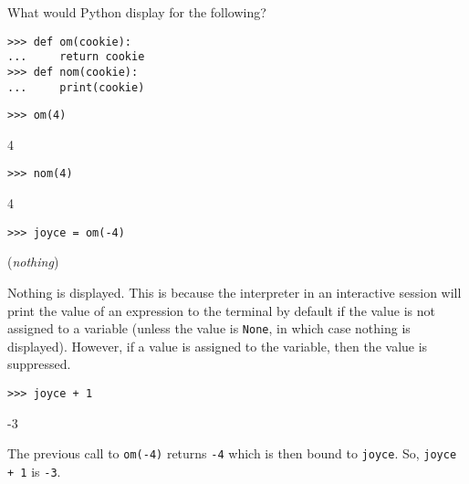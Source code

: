 
\begin{blocksection}
\question What would Python display for the following?
\begin{lstlisting}
>>> def om(cookie):
...     return cookie
>>> def nom(cookie):
...     print(cookie)
\end{lstlisting}
\end{blocksection}
\begin{blocksection}
\begin{lstlisting}
>>> om(4)
\end{lstlisting}
\begin{solution}[0.3in]
4
\end{solution}
\begin{lstlisting}
>>> nom(4)
\end{lstlisting}
\begin{solution}[0.3in]
4
\end{solution}
\end{blocksection}
\begin{blocksection}
\begin{lstlisting}
>>> joyce = om(-4)
\end{lstlisting}
\begin{solution}[0.3in]
(\emph{nothing})

Nothing is displayed. This is because the interpreter in an interactive session
will print the value of an expression to the terminal by default if the value
is not assigned to a variable (unless the value is \texttt{None}, in which case
nothing is displayed). However, if a value is assigned to the variable, then
the value is suppressed.
\end{solution}
\begin{lstlisting}
>>> joyce + 1
\end{lstlisting}
\begin{solution}[0.3in]
-3

The previous call to \texttt{om(-4)} returns \texttt{-4} which is then bound to
\texttt{joyce}. So, \texttt{joyce + 1} is \texttt{-3}.
\end{solution}
\end{blocksection}
